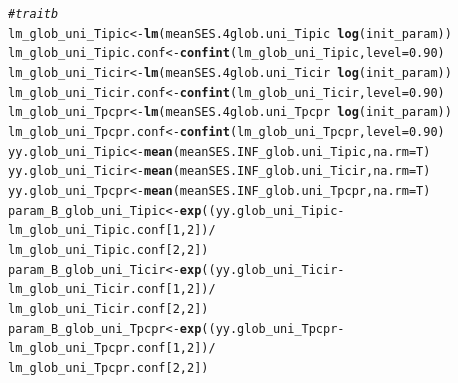 \documentclass[12pt]{article}\usepackage[]{graphicx}\usepackage[]{color}
\makeatletter
\newcommand{\hlnum}[1]{\textcolor[rgb]{0.686,0.059,0.569}{#1}}%
\newcommand{\hlcom}[1]{\textcolor[rgb]{0.678,0.584,0.686}{\textit{#1}}}%
\newcommand{\hlopt}[1]{\textcolor[rgb]{0,0,0}{#1}}%
\newcommand{\hlstd}[1]{\textcolor[rgb]{0.345,0.345,0.345}{#1}}%
\newcommand{\hlkwb}[1]{\textcolor[rgb]{0.69,0.353,0.396}{#1}}%
\newcommand{\hlkwc}[1]{\textcolor[rgb]{0.333,0.667,0.333}{#1}}%
\newcommand{\hlkwd}[1]{\textcolor[rgb]{0.737,0.353,0.396}{\textbf{#1}}}%
\newenvironment{kframe}{%
 \def\at@end@of@kframe{}%
 \ifinner\ifhmode%
  \def\at@end@of@kframe{\end{minipage}}%
  \begin{minipage}{\columnwidth}%
 \fi\fi%
 \def\FrameCommand##1{\hskip\@totalleftmargin \hskip-\fboxsep
 \colorbox{shadecolor}{##1}\hskip-\fboxsep
     \hskip-\linewidth \hskip-\@totalleftmargin \hskip\columnwidth}%
 \MakeFramed {\advance\hsize-\width
   \@totalleftmargin\z@ \linewidth\hsize
   \@setminipage}}%
 {\par\unskip\endMakeFramed%
 \at@end@of@kframe}
\newenvironment{knitrout}{}{} %
\makeatother
\begin{document}
\begin{knitrout}
\begin{kframe}
\begin{alltt}
\hlcom{# trait b}
\hlstd{lm_glob_uni_Tipic} \hlkwb{<-} \hlkwd{lm}\hlstd{(meanSES.4glob.uni_Tipic} \hlopt{~} \hlkwd{log}\hlstd{(init_param))}
\hlstd{lm_glob_uni_Tipic.conf} \hlkwb{<-} \hlkwd{confint}\hlstd{(lm_glob_uni_Tipic ,} \hlkwc{level} \hlstd{=} \hlnum{0.90}\hlstd{)}
\hlstd{lm_glob_uni_Ticir} \hlkwb{<-} \hlkwd{lm}\hlstd{(meanSES.4glob.uni_Ticir} \hlopt{~} \hlkwd{log}\hlstd{(init_param))}
\hlstd{lm_glob_uni_Ticir.conf} \hlkwb{<-} \hlkwd{confint}\hlstd{(lm_glob_uni_Ticir ,} \hlkwc{level} \hlstd{=} \hlnum{0.90}\hlstd{)}
\hlstd{lm_glob_uni_Tpcpr} \hlkwb{<-} \hlkwd{lm}\hlstd{(meanSES.4glob.uni_Tpcpr} \hlopt{~} \hlkwd{log}\hlstd{(init_param))}
\hlstd{lm_glob_uni_Tpcpr.conf} \hlkwb{<-} \hlkwd{confint}\hlstd{(lm_glob_uni_Tpcpr ,} \hlkwc{level} \hlstd{=} \hlnum{0.90}\hlstd{)}
\hlstd{yy.glob_uni_Tipic} \hlkwb{<-} \hlkwd{mean}\hlstd{(meanSES.INF_glob.uni_Tipic,} \hlkwc{na.rm} \hlstd{= T)}
\hlstd{yy.glob_uni_Ticir} \hlkwb{<-} \hlkwd{mean}\hlstd{(meanSES.INF_glob.uni_Ticir,} \hlkwc{na.rm} \hlstd{= T)}
\hlstd{yy.glob_uni_Tpcpr} \hlkwb{<-} \hlkwd{mean}\hlstd{(meanSES.INF_glob.uni_Tpcpr,} \hlkwc{na.rm} \hlstd{= T)}
\hlstd{param_B_glob_uni_Tipic} \hlkwb{<-} \hlkwd{exp}\hlstd{( (yy.glob_uni_Tipic} \hlopt{-} \hlstd{lm_glob_uni_Tipic.conf [}\hlnum{1}\hlstd{,} \hlnum{2}\hlstd{])} \hlopt{/}
                                  \hlstd{lm_glob_uni_Tipic.conf [}\hlnum{2}\hlstd{,} \hlnum{2}\hlstd{] )}
\hlstd{param_B_glob_uni_Ticir} \hlkwb{<-} \hlkwd{exp}\hlstd{( (yy.glob_uni_Ticir} \hlopt{-} \hlstd{lm_glob_uni_Ticir.conf [}\hlnum{1}\hlstd{,} \hlnum{2}\hlstd{])} \hlopt{/}
                                  \hlstd{lm_glob_uni_Ticir.conf [}\hlnum{2}\hlstd{,} \hlnum{2}\hlstd{] )}
\hlstd{param_B_glob_uni_Tpcpr} \hlkwb{<-} \hlkwd{exp}\hlstd{( (yy.glob_uni_Tpcpr} \hlopt{-} \hlstd{lm_glob_uni_Tpcpr.conf [}\hlnum{1}\hlstd{,} \hlnum{2}\hlstd{])} \hlopt{/}
                                  \hlstd{lm_glob_uni_Tpcpr.conf [}\hlnum{2}\hlstd{,} \hlnum{2}\hlstd{] )}


\end{alltt}
\end{kframe}
\end{knitrout}
\end{document}
